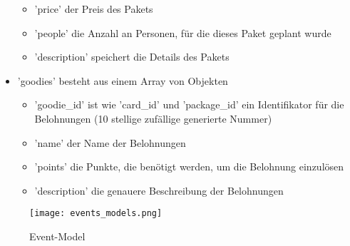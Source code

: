 \begin{itemize}
\begin{itemize}
						\item 'price' der Preis des Pakets
						\item 'people' die Anzahl an Personen, für die dieses Paket geplant wurde
						\item 'description' speichert die Details des Pakets
					\end{itemize}
					\item 'goodies' besteht aus einem Array von Objekten
					\begin{itemize}
						\item 'goodie\_id' ist wie 'card\_id' und 'package\_id' ein Identifikator für die Belohnungen (10 stellige zufällige generierte Nummer)
						\item 'name' der Name der Belohnungen
						\item 'points' die Punkte, die benötigt werden, um die Belohnung einzulösen
						\item 'description' die genauere Beschreibung der Belohnungen
					\end{itemize}				
				\end{itemize}
			
			\begin{figure}[H]
				\centering
				\texttt{[image: events\_models.png]}
				\caption{Event-Model}
			\end{figure}	
			
			\newpage		
				
